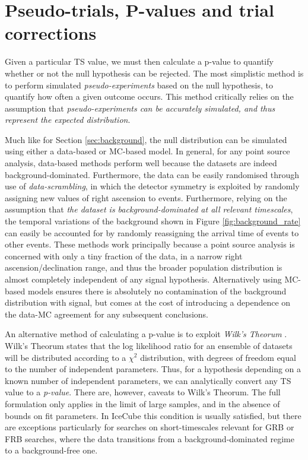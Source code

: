 \section{Pseudo-trials, P-values and trial corrections}
\label{sec:pvalues}

Given a particular TS value, we must then calculate a p-value to quantify whether or not the null hypothesis can be rejected. The most simplistic method is to perform simulated \emph{pseudo-experiments} based on the null hypothesis, to quantify how often a given outcome occurs. This method critically relies on the assumption that \emph{pseudo-experiments can be accurately simulated, and thus represent the expected distribution}. 

Much like for Section \ref{sec:background}, the null distribution can be simulated using either a data-based or MC-based model. In general, for any point source analysis, data-based methods perform well because the datasets are indeed background-dominated. Furthermore, the data can be easily randomised through use of \emph{data-scrambling}, in which the detector symmetry is exploited by randomly assigning new values of right ascension to events. Furthermore, relying on the assumption that \emph{the dataset is background-dominated at all relevant timescales}, the temporal variations of the background shown in Figure \ref{fig:background_rate} can easily be accounted for by randomly reassigning the arrival time of events to other events. These methods work principally because a point source analysis is concerned with only a tiny fraction of the data, in a narrow right ascension/declination range, and thus the broader population distribution is almost completely independent of any signal hypothesis. Alternatively using MC-based models ensures there is absolutely no contamination of the background distribution with signal, but comes at the cost of introducing a dependence on the data-MC agreement for any subsequent conclusions.

An alternative method of calculating a p-value is to exploit \emph{Wilk's Theorum} . Wilk's Theorum states that the log likelihood ratio for an ensemble of datasets will be distributed according to a $\chi^{2}$ distribution, with degrees of freedom equal to the number of independent parameters. Thus, for a hypothesis depending on a known number of independent parameters, we can analytically convert any TS value to a \emph{p-value}. There are, however, caveats to Wilk's Theorum. The full formulation only applies in the limit of large samples, and in the absence of bounds on fit parameters. In IceCube this condition is usually satisfied, but there are exceptions particularly for searches on short-timescales relevant for GRB or FRB searches, where the data transitions from a background-dominated regime to a background-free one.

